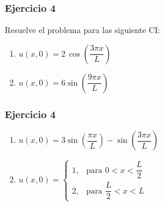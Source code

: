 \documentclass[12pt]{beamer}
\begin{document}
\begin{frame}
\frametitle{Ejercicio 4}
Resuelve el problema para las siguiente CI:
\begin{enumerate}
\item $u (x, 0) = 2 \, \cos \left( \dfrac{3 \pi x}{L} \right)$
\item $u (x, 0) = 6 \sin \left( \dfrac{9 \pi x}{L} \right)$
\seti
\end{enumerate}
\end{frame}
\begin{frame}
\frametitle{Ejercicio 4}
\begin{enumerate} 
\item $u (x, 0) = 3 \sin \left( \dfrac{\pi x}{L} \right) - \sin \left( \dfrac{3 \pi x}{L} \right)$
\item $u (x, 0) = \begin{cases}
  1, & \text{para } 0 < x < \dfrac{L}{2} \\[1em]
  2, & \text{para } \dfrac{L}{2} < x < L
\end{cases}$
\end{enumerate}
\end{frame}
\end{document}
